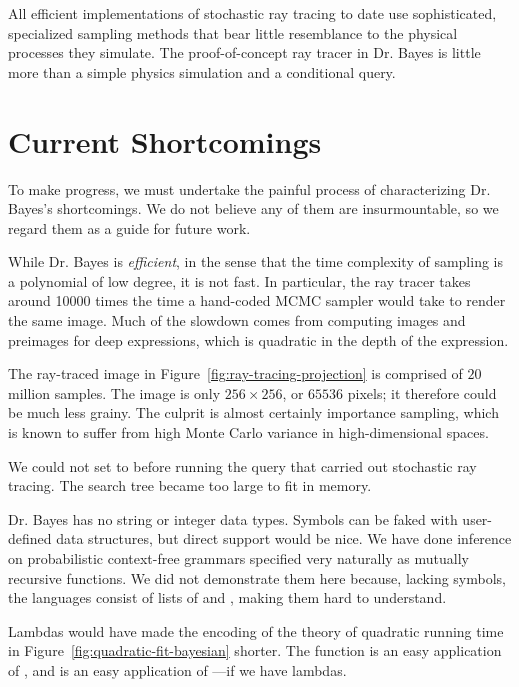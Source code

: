 All efficient implementations of stochastic ray tracing to date use sophisticated, specialized sampling methods that bear little resemblance to the physical processes they simulate.
The proof-of-concept ray tracer in Dr. Bayes is little more than a simple physics simulation and a conditional query.


\section{Current Shortcomings}

To make progress, we must undertake the painful process of characterizing Dr. Bayes's shortcomings.
We do not believe any of them are insurmountable, so we regard them as a guide for future work.

While Dr. Bayes is \emph{efficient}, in the sense that the time complexity of sampling is a polynomial of low degree, it is not fast.
In particular, the ray tracer takes around 10000 times the time a hand-coded MCMC sampler would take to render the same image.
Much of the slowdown comes from computing images and preimages for deep  expressions, which is quadratic in the depth of the expression.

The ray-traced image in Figure~\ref{fig:ray-tracing-projection} is comprised of $20$ million samples.
The image is only $256 \times 256$, or $65536$ pixels; it therefore could be much less grainy.
The culprit is almost certainly importance sampling, which is known to suffer from high Monte Carlo variance in high-dimensional spaces.

We could not set  to  before running the query that carried out stochastic ray tracing.
The search tree became too large to fit in memory.

Dr. Bayes has no string or integer data types.
Symbols can be faked with user-defined data structures, but direct support would be nice.
We have done inference on probabilistic context-free grammars specified very naturally as mutually recursive functions.
We did not demonstrate them here because, lacking symbols, the languages consist of lists of  and , making them hard to understand. 

Lambdas would have made the encoding of the theory of quadratic running time in Figure~\ref{fig:quadratic-fit-bayesian} shorter.
The  function is an easy application of , and  is an easy application of ---if we have lambdas.

